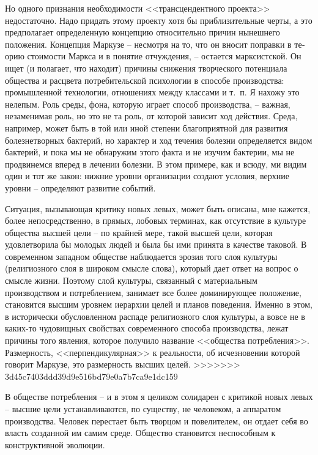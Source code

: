 \documentclass{book}
\begin{document}
{Но одного признания необходимости <<трансцендентного проекта>> недостаточно. Надо придать этому проекту хотя бы приблизительные черты, а это предполагает определенную кон­цепцию относительно причин нынешнего положения. Концеп­ция Маркузе -- несмотря на то, что он вносит поправки в те­орию стоимости Маркса и в понятие отчуждения, -- остается марксистской. Он ищет (и полагает, что находит) причины снижения творческого потенциала общества и расцвета потре­бительской психологии в способе производства: промышлен­ной технологии, отношениях между классами и т.~п. Я нахожу это нелепым. Роль среды, фона, которую играет способ произ­водства, -- важная, незаменимая роль, но это не та роль, от ко­торой зависит ход действия. Среда, например, может быть в той или иной степени благоприятной для развития болезнетвор­ных бактерий, но характер и ход течения болезни определяется видом бактерий, и пока мы не обнаружим этого факта и не изучим бактерии, мы не продвинемся вперед в лечении болезни. В этом примере, как и всюду, ми 
видим один и тот же закон: нижние уровни организации создают условия, верхние уровни -- определяют развитие событий.

Ситуация, вызывающая критику новых левых, может быть описана, мне кажется, более непосредственно, в прямых, лобо­вых терминах, как отсутствие в культуре общества высшей це­ли -- по крайней мере, такой высшей цели, которая удовлетво­рила бы молодых людей и была бы ими принята в качестве та­ковой. В современном западном обществе наблюдается эрозия того слоя культуры (религиозного  слоя в широком смысле слова), который дает ответ на вопрос о смысле жизни. Поэто­му слой культуры, связанный с материальным производством и потреблением, занимает все более доминирующее положение, становится высшим уровнем иерархии целей и планов поведе­ния. Именно в этом, в исторически обусловленном распаде ре­лигиозного слоя культуры, а вовсе не в каких-то чудовищных свойствах современного способа производства, лежат причины того явления, которое получило название <<общества потребле­ния>>. Размерность, <<перпендикулярная>> к реальности, об исчез­новении которой говорит Маркузе, это размерность высших целей.
>>>>>>> 3d45c7403ddd39d9e516bd79e0a7b7ca9e1dc159

В обществе потребления -- и в этом я целиком солидарен с критикой новых левых -- высшие цели устанавливаются, по су­ществу, не человеком, а аппаратом производства. Человек пе­рестает быть творцом и повелителем, он отдает себя во власть созданной им самим среде. Общество становится неспособным к конструктивной эволюции.

}
\end{document}

